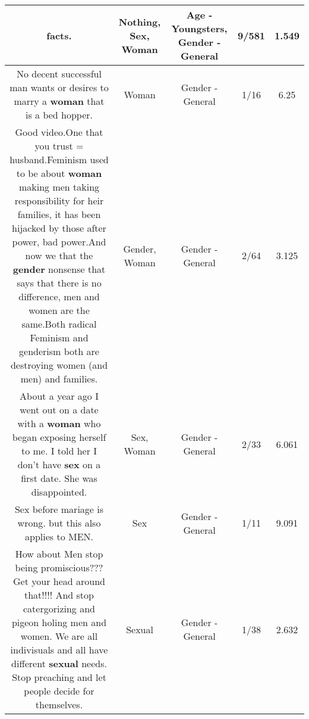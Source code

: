 \documentclass[11pt]{article}
\newlength\mylength
\begin{document}
\begin{center}
\begin{longtable}{|C{.65\mylength}|C{.30\mylength}|C{.12\mylength}|C{.12\mylength}|C{.12\mylength}|}
facts.\normalsize   & Nothing, Sex, Woman & Age - Youngsters, Gender - General & 9/581 & 1.549 \\  \hline
  \small No decent successful man wants or desires to marry a \textbf{woman} that is a bed hopper.\normalsize   & Woman & Gender - General & 1/16 & 6.25 \\  \hline
  \small Good video.One that you trust = husband.Feminism used to be about \textbf{woman} making men taking responsibility for heir families, it has been hijacked by those after power, bad power.And now we that the \textbf{gender} nonsense that says that there is no difference, men and women are the same.Both radical Feminism and genderism both are destroying women (and men) and families.\normalsize   & Gender, Woman & Gender - General & 2/64 & 3.125 \\  \hline
  \small About a year ago I went out on a date with a \textbf{woman} who began exposing herself to me. I told her I don't have \textbf{sex} on a first date. She was disappointed.\normalsize   & Sex, Woman & Gender - General & 2/33 & 6.061 \\  \hline
  \small Sex before mariage is wrong. but this also applies to MEN.\normalsize   & Sex & Gender - General & 1/11 & 9.091 \\  \hline
  \small How about Men stop being promiscious??? Get your head around that!!!! And stop catergorizing and pigeon holing men and women. We are all indivisuals and all have different  \textbf{sexual} needs. Stop preaching and let people decide for themselves.\normalsize   & Sexual & Gender - General & 1/38 & 2.632 \\  \hline

\end{longtable}
\end{center}
\end{document}
